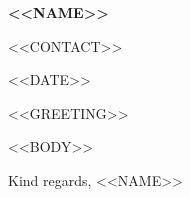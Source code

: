 \documentclass[11pt,a4paper]{article}
\begin{document}
{\Large\textbf{<<NAME>>}}\par\vspace{2pt}
{\small\color{dark-grey}<<CONTACT>>\par}

\vspace{6pt}
<<DATE>>

<<GREETING>>

<<BODY>>

Kind regards,\newline
<<NAME>>
\end{document}
